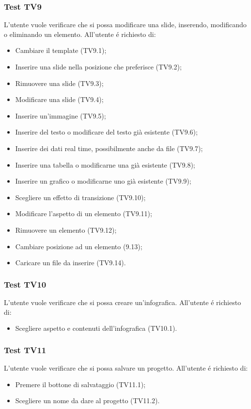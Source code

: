 \subsubsection{Test TV9}
L'utente vuole verificare che si possa modificare una slide, inserendo, modificando o eliminando un elemento. \newline
All'utente é richiesto di:
\begin{itemize}
	\item Cambiare il template (TV9.1);
	\item Inserire una slide nella posizione che preferisce (TV9.2);
	\item Rimuovere una slide (TV9.3);
	\item Modificare una slide (TV9.4);
	\item Inserire un'immagine (TV9.5);
	\item Inserire del testo o modificare del testo già esistente (TV9.6);
	\item Inserire dei dati real time, possibilmente anche da file (TV9.7);
	\item Inserire una tabella o modificarne una già esistente (TV9.8);
	\item Inserire un grafico o modificarne uno già esistente (TV9.9);
	\item Scegliere un effetto di transizione (TV9.10);
	\item Modificare l'aspetto di un elemento (TV9.11);
	\item Rimuovere un elemento (TV9.12);
	\item Cambiare posizione ad un elemento (9.13);
	\item Caricare un file da inserire (TV9.14).
\end{itemize}

\subsubsection{Test TV10}
L'utente vuole verificare che si possa creare un'infografica. \newline
All'utente é richiesto di:
\begin{itemize}
	\item Scegliere aspetto e contenuti dell'infografica (TV10.1).
\end{itemize}

\subsubsection{Test TV11}
L'utente vuole verificare che si possa salvare un progetto. \newline
All'utente é richiesto di:
\begin{itemize}
	\item Premere il bottone di salvataggio (TV11.1);
	\item Scegliere un nome da dare al progetto (TV11.2).
\end{itemize}

